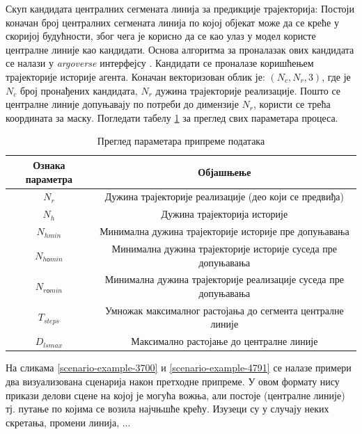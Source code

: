 \documentclass[11pt,oneside]{memoir}
\begin{document}
Скуп кандидата централних сегмената линија за предикције трајекторија: Постоји коначан број централних сегмената линија по којој
објекат може да се креће у скоријој будућности, због чега је корисно да се као улаз у модел користе централне линије као кандидати. 
Основа алгоритма за проналазак ових кандидата се налази у \textit{argoverse} интерфејсу \cite{argoverse}. Кандидати се проналазе
коришћењем трајекторије историје агента. Коначан векторизован облик је: $(N_c, N_r, 3)$, где је $N_c$ број пронађених кандидата,
$N_r$ дужина трајекторије реализације. Пошто се централне линије допуњавају по потреби до димензије $N_r$, користи се трећа координата
за маску. Погледати табелу \ref{dp-params-table} за преглед свих параметара процеса.

\begin{table}
  \begin{tabular}{c|c}
    Ознака параметра & Објашњење \\
    \hline
    $N_r$ & Дужина трајекторије реализације (део који се предвиђа) \\
    $N_h$ & Дужина трајекторија историје \\
    $N_{hmin}$ & Минимална дужина трајекторије историје пре допуњавања \\
    $N_{hоmin}$ & Минимална дужина трајекторије историје суседа пре допуњавања \\
    $N_{rоmin}$ & Минимална дужина трајекторије реализације суседа пре допуњавања \\
    $T_{steps}$ & Умножак максималног растојања до сегмента централне линије \\
    $D_{lsmax}$ & Максимално растојање до централне линије
  \end{tabular}
  \caption{Преглед параметара припреме података}
  \label{dp-params-table}
\end{table}

На сликама \ref{scenario-example-3700} и \ref{scenario-example-4791} се налазе примери два визуализована сценарија
након претходне припреме. У овом формату нису прикази делови сцене на којој је могућа вожња, али 
постоје (централне линије) тј. путање по којима се возила најчњшће крећу. Изузеци су у случају неких скретања,
промени линија, ...
\end{document}
